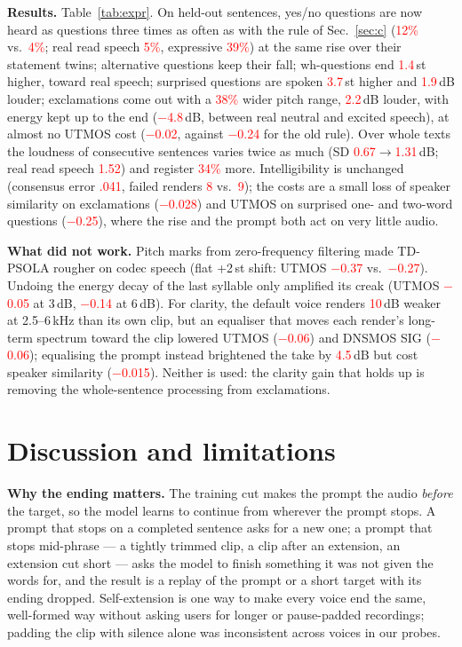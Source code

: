 \documentclass[conference]{IEEEtran}
\newcommand{\RES}[1]{\textcolor{red}{#1}}
\begin{document}
\textbf{Results.} Table~\ref{tab:expr}. On held-out sentences, yes/no questions are now heard as questions
three times as often as with the rule of Sec.~\ref{sec:c} (\RES{12\%} vs.\ \RES{4\%}; real read speech
\RES{5\%}, expressive \RES{39\%}) at the same rise over their statement twins; alternative questions keep
their fall; wh-questions end \RES{1.4}\,st higher, toward real speech; surprised questions are spoken
\RES{3.7}\,st higher and \RES{1.9}\,dB louder; exclamations come out with a \RES{38\%} wider pitch range,
\RES{2.2}\,dB louder, with energy kept up to the end (\RES{$-$4.8}\,dB, between real neutral and excited
speech), at almost no UTMOS cost (\RES{$-$0.02}, against \RES{$-$0.24} for the old rule). Over whole texts
the loudness of consecutive sentences varies twice as much (SD \RES{0.67}$\to$\RES{1.31}\,dB; real read speech
\RES{1.52}) and register \RES{34\%} more. Intelligibility is unchanged (consensus error \RES{.041}, failed
renders \RES{8} vs.\ \RES{9}); the costs are a small loss of speaker similarity on exclamations
(\RES{$-$0.028}) and UTMOS on surprised one- and two-word questions (\RES{$-$0.25}), where the rise and the
prompt both act on very little audio.

\textbf{What did not work.} Pitch marks from zero-frequency filtering \cite{zff2008} made TD-PSOLA rougher on
codec speech (flat +2\,st shift: UTMOS \RES{$-$0.37} vs.\ \RES{$-$0.27}). Undoing the energy decay of the last
syllable only amplified its creak (UTMOS \RES{$-$0.05} at 3\,dB, \RES{$-$0.14} at 6\,dB). For clarity, the default
voice renders \RES{10}\,dB weaker at 2.5--6\,kHz than its own clip, but an equaliser that moves each render's
long-term spectrum toward the clip lowered UTMOS (\RES{$-$0.06}) and DNSMOS SIG (\RES{$-$0.06}); equalising
the prompt instead brightened the take by \RES{4.5}\,dB but cost speaker similarity (\RES{$-$0.015}). Neither
is used: the clarity gain that holds up is removing the whole-sentence processing from exclamations.

\section{Discussion and limitations}
\textbf{Why the ending matters.} The training cut makes the prompt the audio \emph{before} the target, so
the model learns to continue from wherever the prompt stops. A prompt that stops on a completed sentence
asks for a new one; a prompt that stops mid-phrase --- a tightly trimmed clip, a clip after an extension, an
extension cut short --- asks the model to finish something it was not given the words for, and the result
is a replay of the prompt or a short target with its ending dropped. Self-extension is one way to make every
voice end the same, well-formed way without asking users for longer or pause-padded recordings; padding the
clip with silence alone was inconsistent across voices in our probes.
\end{document}
